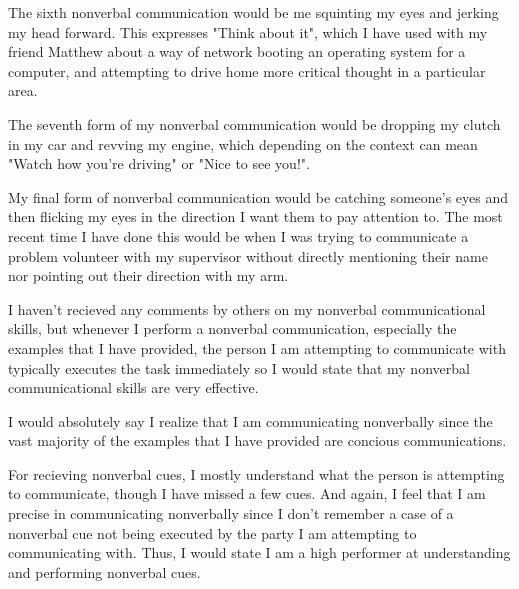 \documentclass[12pt]{article}
\begin{document}
\par
The sixth nonverbal communication would be me squinting my eyes and jerking my head forward. This expresses "Think about it", which I have used with my friend Matthew about a way of network booting an operating system for a computer, and attempting to drive home more critical thought in a particular area.
\par
The seventh form of my nonverbal communication would be dropping my clutch in my car and revving my engine, which depending on the context can mean "Watch how you're driving" or "Nice to see you!".
\par
My final form of nonverbal communication would be catching someone's eyes and then flicking my eyes in the direction I want them to pay attention to. The most recent time I have done this would be when I was trying to communicate a problem volunteer with my supervisor without directly mentioning their name nor pointing out their direction with my arm.
\par
I haven't recieved any comments by others on my nonverbal communicational skills, but whenever I perform a nonverbal communication, especially the examples that I have provided, the person I am attempting to communicate with typically executes the task immediately so I would state that my nonverbal communicational skills are very effective.
\par
I would absolutely say I realize that I am communicating nonverbally since the vast majority of the examples that I have provided are concious communications.
\par
For recieving nonverbal cues, I mostly understand what the person is attempting to communicate, though I have missed a few cues. And again, I feel that I am precise in communicating nonverbally since I don't remember a case of a nonverbal cue not being executed by the party I am attempting to communicating with. Thus, I would state I am a high performer at understanding and performing nonverbal cues.
\end{document}
